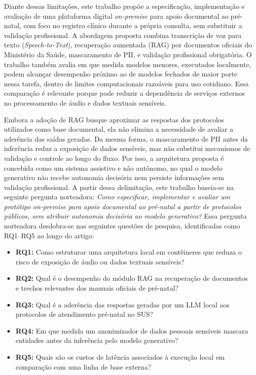 Diante dessas limitações, este trabalho propõe a especificação, implementação e avaliação de uma plataforma digital \textit{on-premise} para apoio documental ao pré-natal, com foco no registro clínico durante a própria consulta, sem substituir a validação profissional. A abordagem proposta combina transcrição de voz para texto (\textit{Speech-to-Text}), recuperação aumentada (RAG) por documentos oficiais do Ministério da Saúde, mascaramento de PII, e validação profissional obrigatória. O trabalho também avalia em que medida modelos menores, executados localmente, podem alcançar desempenho próximo ao de modelos fechados de maior porte nessa tarefa, dentro de limites computacionais razoáveis para uso cotidiano. Essa comparação é relevante porque pode reduzir a dependência de serviços externos no processamento de áudio e dados textuais sensíveis. 

Embora a adoção de RAG busque aproximar as respostas dos protocolos utilizados como base documental, ela não elimina a necessidade de avaliar a aderência das saídas geradas. Da mesma forma, o mascaramento de PII antes da inferência reduz a exposição de dados sensíveis, mas não substitui mecanismos de validação e controle ao longo do fluxo. Por isso, a arquitetura proposta é concebida como um sistema assistivo e não autônomo, no qual o modelo generativo não recebe autonomia decisória nem persiste informações sem validação profissional. A partir dessa delimitação, este trabalho baseia-se na seguinte pergunta norteadora: \textit{Como especificar, implementar e avaliar um protótipo on-premise para apoio documental ao pré-natal a partir de protocolos públicos, sem atribuir autonomia decisória ao modelo generativo?}
Essa pergunta norteadora desdobra-se nas seguintes questões de pesquisa, identificadas como RQ1--RQ5 ao longo do artigo:
\begin{itemize}
\item \textbf{RQ1:} Como estruturar uma arquitetura local em contêineres que reduza o risco de exposição de áudio ou dados textuais sensíveis?
  \item \textbf{RQ2:} Qual é o desempenho do módulo RAG na recuperação de documentos e trechos relevantes dos manuais oficiais de pré-natal?
	\item \textbf{RQ3:} Qual é a aderência das respostas geradas por um LLM local aos protocolos de atendimento pré-natal no SUS?
	\item \textbf{RQ4:} Em que medida um anonimizador de dados pessoais sensíveis mascara entidades antes da inferência pelo modelo generativo?
	\item \textbf{RQ5:} Quais são os custos de latência associados à execução local em comparação com uma linha de base externa?
\end{itemize}


